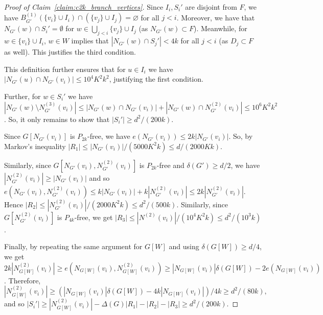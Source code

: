 \documentclass[10pt, a4paper]{article}
\numberwithin{theorem}{section} %
\theoremstyle{remark}
\theoremstyle{definition}
\begin{document}
\begin{proof}[Proof of Claim~\ref{claim:c2k_branch_vertices}]
         Since $I_i, S_i'$ are disjoint from $F$, we have $B^{(1)}_{G'}(\{v_i\} \cup I_i) \cap (\{v_j\} \cup I_j) = \varnothing$ for all $j<i$. Moreover, we have that $N_{G'}(w)\cap S_i' = \emptyset$ for $w\in \bigcup_{j<i} \{v_j\}\cup I_j$ (as $N_{G'}(w)\subset F$). Meanwhile, for $w\in \{v_i\}\cup I_i$, $w\in W$ implies that $|N_{G'}(w)\cap S_j'|< 4k$ for all $j<i$ (as $D_j \subset F$ as well). This justifies the third condition.
         
         This definition further ensures that for $u\in I_i$ we have $|N_{G'}(u)\cap N_{G'}(v_i)|\leq 10^4K^2k^2$, justifying the first condition.
         
         Further, for $w\in S_i'$ we have $|N_{G'}(w) \setminus N_{G'}^{(3)}(v_i)|\leq |N_{G'}(w) \cap N_{G'}(v_i)| + |N_{G'}(w) \cap N_{G'}^{(2)}(v_i)| \leq 10^6 K^2k^2$. So, it only remains to show that $|S_i'|\geq d^2/(200k)$.
        
        Since $G[N_{G'}(v_i)]$ is $P_{2k}$-free, we have $e(N_{G'}(v_i)) \leq 2k|N_{G'}(v_i)|$. So, by Markov's inequality $|R_1| \leq |N_{G'}(v_i)| / (5000K^2k) \leq d / (2000Kk)$.
        
        Similarly, since $G[N_{G'}(v_i), N^{(2)}_{G'}(v_i)]$ is $P_{2k}$-free and $\delta(G') \geq d/2$, we have $|N^{(2)}_{G'}(v_i)| \geq |N_{G'}(v_i)|$ and so $e(N_{G'}(v_i), N^{(2)}_{G'}(v_i))\leq k|N_{G'}(v_i)|+ k|N^{(2)}_{G'}(v_i)|\leq 2k|N^{(2)}_{G'}(v_i)|$. Hence $|R_2| \leq |N^{(2)}_{G'}(v_i)|/(2000K^2k) \leq d^2/(500k)$. Similarly, since $G[N_{G'}^{(2)}(v_i)]$ is $P_{4k}$-free, we get $|R_3| \leq |N^{(2)}(v_i)| / (10^4K^2k) \leq d^2/(10^3k)$.
        
        Finally, by repeating the same argument for $G[W]$ and using $\delta(G[W])\geq d/4$, we get $2k|N^{(2)}_{G[W]}(v_i)|\geq e(N_{G[W]}(v_i), N^{(2)}_{G[W]}(v_i))\geq |N_{G[W]}(v_i)|\delta(G[W]) - 2e(N_{G[W]}(v_i))$. Therefore,
        \[
            |N_{G[W]}^{(2)}(v_i)| \geq (|N_{G[W]}(v_i)|\delta(G[W]) - 4k|N_{G[W]}(v_i)|)/4k \geq d^2/(80k),
        \]
        and so $|S_i'| \geq |N_{G[W]}^{(2)}(v_i)| - \Delta(G)|R_1| - |R_2| - |R_3| \geq d^2/(200k)$.\hspace{5.5cm} \qedsymbol
    \end{proof}

\vspace{-0.5cm}
\end{document}
